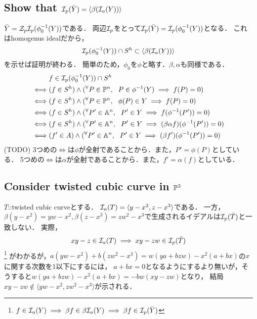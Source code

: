 \documentclass[a4paper]{jarticle}
\begin{document}
    \subsection{Show that $\mathcal{I}_p(\bar{Y})=\langle \beta(\mathcal{I}_a(Y)) \rangle$}
    $\bar{Y}=\mathcal{Z}_p \mathcal{I}_p(\phi_0^{-1}(Y))$である．
    両辺$\mathcal{I}_p$をとって$\mathcal{I}_p(\bar{Y})=\mathcal{I}_p(\phi_0^{-1}(Y))$となる．
    これはhomogenus idealだから，
    \[ \mathcal{I}_p(\phi_0^{-1}(Y)) \cap S^h \subset \langle \beta(\mathcal{I}_a(Y)) \rangle \]を示せば証明が終わる．
    簡単のため，$\phi_0$を$\phi$と略す．$\beta, \alpha$も同様である．
    \begin{align*}
            &   f \in \mathcal{I}_p(\phi_0^{-1}(Y)) \cap S^h \\
        \iff&   (f \in S^h) \land ({}^{\forall} P \in \mathbb{P}^n,~~ P \in \phi^{-1}(Y) \implies f(P)=0) \\
        \iff&   (f \in S^h) \land ({}^{\forall} P \in \mathbb{P}^n,~~ \phi(P) \in Y \implies f(P)=0) \\
        \iff&   (f \in S^h) \land ({}^{\forall} P' \in \mathbb{A}^n,~~ P' \in Y \implies f(\phi^{-1}(P'))=0) \\
        \iff&   (f \in S^h) \land ({}^{\forall} P' \in \mathbb{A}^n,~~ P' \in Y \implies (\beta \alpha f)(\phi^{-1}(P'))=0) \\
        \iff&   (f' \in A) \land ({}^{\forall} P' \in \mathbb{A}^n,~~ P' \in Y \implies (\beta f')(\phi^{-1}(P'))=0) \\
    \end{align*}
    (TODO)
    3つめの$\iff$は$\phi$が全射であることから．また，$P'=\phi(P)$としている．
    5つめの$\iff$は$\alpha$が全射であることから．また，$f'=\alpha(f)$としている．

    \subsection{Consider twisted cubic curve in $\mathbb{P}^3$}
    $T$::twisted cubic curveとする．
    $\mathcal{I}_a(T)=\langle y-x^2, z-x^3 \rangle$である．
    一方，$\beta(y-x^2)=yw-x^2, \beta(z-x^3)=zw^2-x^3$で生成されるイデアルは$\mathcal{I}_p(\bar{T})$と一致しない．
    実際，\[ xy-z \in \mathcal{I}_a(T) \implies xy-zw \in \mathcal{I}_p(\bar{T})\]
    \footnote{$f \in \mathcal{I}_a(Y) \implies \beta f \in \beta \mathcal{I}_a(Y) \implies \beta f \in \mathcal{I}_p(\bar{Y})$}
    がわかるが，$a(yw-x^2)+b(zw^2-x^3)=w(ya+bzw)-x^2(a+bx)$の$x$に関する次数を1以下にするには，
    $a+bx=0$となるようにするより無いが，そうすると$w(ya+bzw)-x^2(a+bx)=-bw(xy-zw)$となり，
    結局$xy-zw \not \in \langle yw-x^2, zw^2-x^3 \rangle$が示される．
\end{document}
